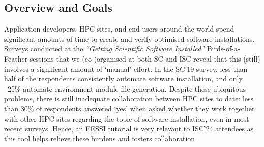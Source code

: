 

\subsection*{Overview and Goals}

Application developers, HPC sites, and end users around the world
spend significant amounts of time to create and verify optimised software installations. Surveys conducted at the
\emph{``Getting Scientific Software Installed''} Birds-of-a-Feather sessions that we (co-)organised at both SC and ISC reveal that this (still) involves a significant amount of `manual' effort.
In the SC'19 survey,
less than half of the respondents consistently automate software installation,
and only ~25\% automate environment module file generation.
Despite these ubiquitous problems,
there is still inadequate collaboration
between HPC sites to date: less than 30\% of respondents answered `yes' when asked whether they
work together with other HPC sites regarding the topic of software installation, even in most recent surveys.
Hence, an EESSI tutorial is very relevant to ISC'24 attendees as this tool helps relieve these burdens and fosters collaboration.

